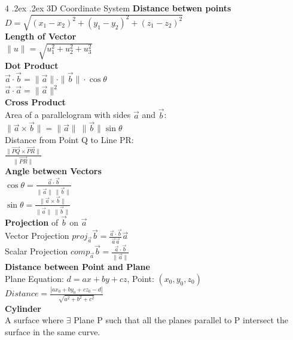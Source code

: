 \documentclass[10pt,landscape,a4paper]{article}
\makeatletter
\renewcommand{\section}{\@startsection{section}{1}{0mm}%
                                {.2ex}%
                                {.2ex}%
                                {\color{myblue}\sffamily\small\bfseries}}
\makeatother
\begin{document}
\begin{multicols*}{4}
\section{3D Coordinate System}
\textbf{Distance betwen points}\\
$D=\sqrt{(x_1-x_2)^2+(y_1-y_2)^2+(z_1-z_2)^2}$\\
\textbf{Length of Vector}\\
$\|u\|=\sqrt{u_1^2+u_2^2+u_3^2}$\\
\textbf{Dot Product}\\
$\overrightarrow{a}\cdot\overrightarrow{b}=\|\overrightarrow{a}\|\cdot\|\overrightarrow{b}\|\cdot\cos\theta$\\
$\overrightarrow{a}\cdot\overrightarrow{a}=\|\overrightarrow{a}\|^2$\\
\textbf{Cross Product}\\
Area of a parallelogram with sides $\overrightarrow{a}$ and $\overrightarrow{b}$:\\
$\|\overrightarrow{a}\times\overrightarrow{b}\|=\|\overrightarrow{a}\|\ \|\overrightarrow{b}\|\sin\theta$\\
Distance from Point Q to Line PR:\\
$\frac{\|\overrightarrow{PQ}\times\overrightarrow{PR}\|}{\|\overrightarrow{PR}\|}$\\
\textbf{Angle between Vectors}\\
$\cos\theta=\frac{\overrightarrow{a}\cdot\overrightarrow{b}}{\|\overrightarrow{a }\|\ \|\overrightarrow{b }\|}$\\
$\sin\theta=\frac{\|\overrightarrow{a }\times\overrightarrow{b }\|}{\|\overrightarrow{a }\|\ \|\overrightarrow{b }\|}$\\
\textbf{Projection} of $\overrightarrow{b}$ on $\overrightarrow{a}$\\
Vector Projection $proj_{\overrightarrow{a}}\overrightarrow{b}=\frac{\overrightarrow{a}\cdot\overrightarrow{b}}{\overrightarrow{a}\overrightarrow{a}}\overrightarrow{a}$\\
Scalar Projection $comp_{\overrightarrow{a}}\overrightarrow{b}=\frac{\overrightarrow{a}\cdot\overrightarrow{b}}{\|\overrightarrow{a}\|}$\\
\textbf{Distance between Point and Plane}\\
Plane Equation: $d=ax+by+cz$, Point: $(x_0, y_0, z_0)$\\
$Distance = \frac{|ax_0+by_0+cz_0-d|}{\sqrt{a^2+b^2+c^2}}$\\
\textbf{Cylinder}\\
A surface where $\exists$ Plane P such that all the planes parallel to P intersect the surface in the same curve.

\end{multicols*}
\end{document}
